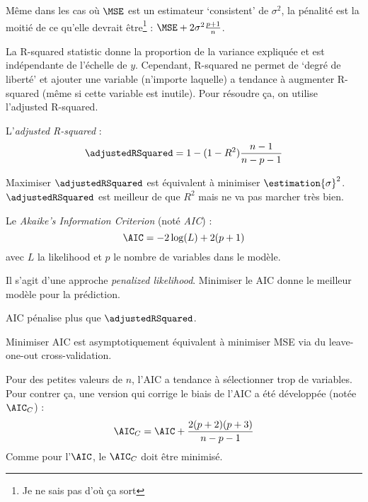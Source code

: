         Même dans les cas où \(\MSE\) est un estimateur `consistent' de \(\sigma^2\), la pénalité est la moitié de ce qu'elle devrait être\footnote{Je ne sais pas d'où ça sort} : \(\MSE + 2\sigma^2 \frac{p+1}{n}\).

        La R-squared statistic donne la proportion de la variance expliquée et est indépendante de l'échelle de \(y\). Cependant, R-squared ne permet de `degré de liberté' et ajouter une variable (n'importe laquelle) a tendance à augmenter R-squared (même si cette variable est inutile). Pour résoudre ça, on utilise l'adjusted R-squared.

        \begin{definition}
            L'\textit{adjusted R-squared} :
            \[
                \adjustedRSquared = 1 - (1 - R^2) \frac{n-1}{n - p - 1}
            \]
        \end{definition}

        Maximiser \(\adjustedRSquared\) est équivalent à minimiser \(\estimation{\sigma}^2\). \(\adjustedRSquared\) est meilleur de que \(R^2\) mais ne va pas marcher très bien.

        \begin{definition}
            Le \textit{Akaike's Information Criterion} (noté \textit{AIC}) :
            \[
                \AIC = -2 \log(L) + 2(p+1)
            \]
            avec \(L\) la likelihood et \(p\) le nombre de variables dans le modèle.

            Il s'agit d'une approche \textit{penalized likelihood}. Minimiser le AIC donne le meilleur modèle pour la prédiction.

            AIC pénalise plus que \(\adjustedRSquared\).

            Minimiser AIC est asymptotiquement équivalent à minimiser MSE via du leave-one-out cross-validation.

            Pour des petites valeurs de \(n\), l'AIC a tendance à sélectionner trop de variables. Pour contrer ça, une version qui corrige le biais de l'AIC a été développée (notée \(\AIC_C\)) :
            \[
                \AIC_C = \AIC + \frac{2(p + 2)(p + 3)}{n - p - 1}
            \]
            Comme pour l'\(\AIC\), le \(\AIC_C\) doit être minimisé.
        \end{definition}


